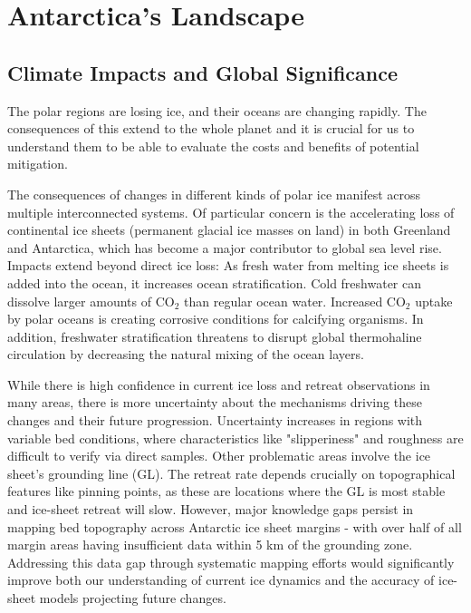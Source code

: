 \chapter{Antarctica's Landscape}\label{why}
\section{Climate Impacts and Global Significance}

The polar regions are losing ice, and their oceans are changing rapidly\cite{O_C_in_changingClimate}. The consequences of this extend to the whole planet and it is crucial for us to understand them to be able to evaluate the costs and benefits of potential mitigation. 

The consequences of changes in different kinds of polar ice manifest across multiple interconnected systems. Of particular concern is the accelerating loss of continental ice sheets (permanent glacial ice masses on land) in both Greenland and Antarctica, which has become a major contributor to global sea level rise\cite{O_C_in_changingClimate}. Impacts extend beyond direct ice loss: As fresh water from melting ice sheets is added into the ocean, it increases ocean stratification. Cold freshwater can dissolve larger amounts of $\mathrm{CO_2}$ than regular ocean water. Increased $\mathrm{CO_2}$ uptake by polar oceans is creating corrosive conditions for calcifying organisms\cite{O_C_in_changingClimate}. In addition, freshwater stratification threatens to disrupt global thermohaline circulation\cite{Jacobs_2004} by decreasing the natural mixing of the ocean layers.
 
While there is high confidence in current ice loss and retreat observations in many areas, there is more uncertainty about the mechanisms driving these changes and their future progression\cite{Fox-Kemper_2021}. Uncertainty increases in regions with variable bed conditions, where characteristics like "slipperiness" and roughness are difficult to verify via direct samples. Other problematic areas involve the ice sheet's grounding line (GL). The retreat rate depends crucially on topographical features like pinning points, as these are locations where the GL is most stable and ice-sheet retreat will slow\cite{Fox-Kemper_2021}. However, major knowledge gaps persist in mapping bed topography across Antarctic ice sheet margins - with over half of all margin areas having insufficient data within 5 km of the grounding zone\cite{RINGS_2022}. Addressing this data gap through systematic mapping efforts would significantly improve both our understanding of current ice dynamics and the accuracy of ice-sheet models projecting future changes.

